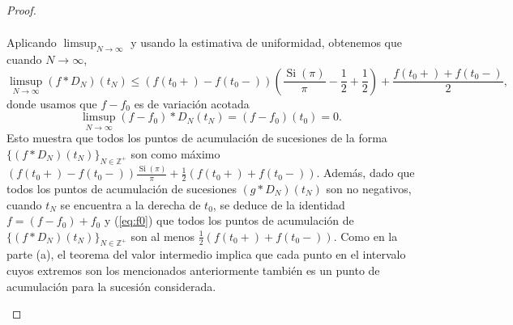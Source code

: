 \begin{proof}
\begin{enumerate}
\begin{align*}
      \end{align*}
      Aplicando \( \limsup_{N \to \infty} \) y usando la estimativa de uniformidad, obtenemos que cuando \( N \to \infty \),
      \[
      \limsup_{N \to \infty} (f * D_N)(t_N) \leq (f(t_0+) - f(t_0-)) \left( \frac{\operatorname{Si}(\pi)}{\pi} - \frac{1}{2} + \frac{1}{2} \right) + \frac{f(t_0+) + f(t_0-)}{2},
      \]
      donde usamos que $f-f_0$ es de variación acotada 
      \[
      \limsup_{N \to \infty} (f - f_0) * D_N(t_N) = (f - f_0)(t_0) = 0.
      \]
      Esto muestra que todos los puntos de acumulación de sucesiones de la forma \( \{(f * D_N)(t_N)\}_{N \in \mathbb{Z}^+} \) son como máximo \( (f(t_0+) - f(t_0-)) \frac{\operatorname{Si}(\pi)}{\pi} + \frac{1}{2} (f(t_0+) + f(t_0-)) \). Además, dado que todos los puntos de acumulación de sucesiones \( (g * D_N)(t_N) \) son no negativos, cuando \( t_N \) se encuentra a la derecha de \( t_0 \), se deduce de la identidad \( f = (f - f_0) + f_0 \) y (\ref{eq:f0}) que todos los puntos de acumulación de \( \{(f * D_N)(t_N)\}_{N \in \mathbb{Z}^+} \) son al menos \( \frac{1}{2} (f(t_0+) + f(t_0-)) \). Como en la parte (a), el teorema del valor intermedio implica que cada punto en el intervalo cuyos extremos son los mencionados anteriormente también es un punto de acumulación para la sucesión considerada.
  \end{enumerate}
\end{proof}



